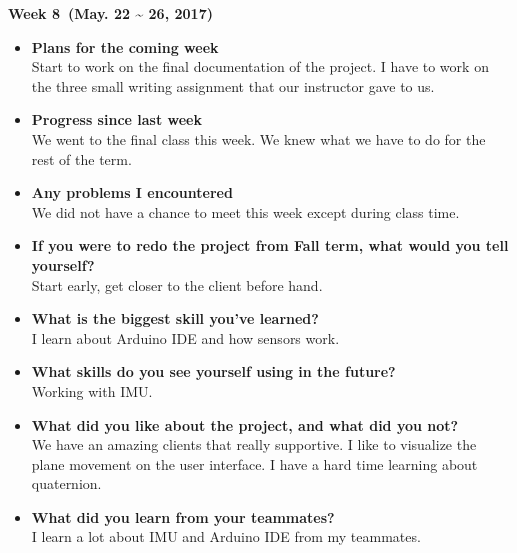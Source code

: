 	\begin{center}
		\textbf{Week 8 (May. 22 {\textasciitilde{}} 26, 2017)}
	\end{center}
	\begin{itemize}
		\item \textbf{Plans for the coming week}
		\\Start to work on the final documentation of the project. I have to work on the three small writing assignment that our instructor gave to us. \\

		\item \textbf{Progress since last week}
		\\We went to the final class this week. We knew what we have to do for the rest of the term. \\

		\item \textbf{Any problems I encountered}
		\\We did not have a chance to meet this week except during class time.\\

		\item \textbf{If you were to redo the project from Fall term, what would you tell yourself?}
		\\Start early, get closer to the client before hand.\\

		\item \textbf{What is the biggest skill you've learned?}
		\\ I learn about Arduino IDE and how sensors work.\\

		\item \textbf{What skills do you see yourself using in the future?}
		\\Working with IMU.\\

		\item \textbf{What did you like about the project, and what did you not?}
		\\We have an amazing clients that really supportive. I like to visualize the plane movement on the user interface. I have a hard time learning about quaternion.\\

		\item \textbf{What did you learn from your teammates?}
		\\I learn a lot about IMU and Arduino IDE from my teammates.\\


\end{itemize}
